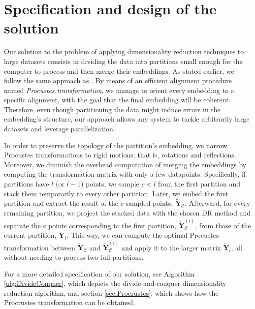 \section{Specification and design of the solution}

Our solution to the problem of applying dimensionality reduction techniques to large datasets consists in dividing the data into partitions small enough for the computer to process and then merge their embeddings. As stated earlier, we follow the same approach as \citet{Delicado2024}. By means of an efficient alignment procedure named \textit{Procustes transformation}, we manage to orient every embedding to a specific alignment, with the goal that the final embedding will be coherent. Therefore, even though partitioning the data might induce errors in the embedding's structure, our approach allows any system to tackle arbitrarily large datasets and leverage parallelization.

In order to preserve the topology of the partition's embedding, we narrow Procustes transformations to rigid motions; that is, rotations and reflections. Moreover, we diminish the overhead computation of merging the embeddings by computing the transformation matrix with only a few datapoints. Specifically, if partitions have $l$ (or $l-1$) points, we sample $c < l$ from the first partition and stack them temporarily to every other partition. Later, we embed the first partition and extract the result of the $c$ sampled points, $\mathbf{\tilde{Y}}_{\mathcal{C}}$. Afterward, for every remaining partition, we project the stacked data with the chosen DR method and separate the $c$ points corresponding to the first partition, $\mathbf{\tilde{Y}}_{\mathcal{C}}^{(i)}$, from those of the current partition, $\mathbf{\tilde{Y}}_{i}$. This way, we can compute the optimal Procustes transformation between $\mathbf{\tilde{Y}}_{\mathcal{C}}$ and $\mathbf{\tilde{Y}}_{\mathcal{C}}^{(i)}$ and apply it to the larger matrix $\mathbf{\tilde{Y}}_i$, all without needing to process two full partitions.

For a more detailed specification of our solution, see Algorithm \ref{alg:DivideConquer}, which depicts the divide-and-conquer dimensionality reduction algorithm, and section \ref{sec:Procrustes}, which shows how the Procrustes transformation can be obtained.

